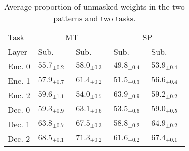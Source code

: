 \begin{table}[t]
    \centering
    \small
    \begin{tabular}{p{0.12\linewidth}p{0.15\linewidth}p{0.15\linewidth}p{0.15\linewidth}p{0.15\linewidth}}\toprule
    Task & \multicolumn{2}{c}{MT} & \multicolumn{2}{c}{SP}\\
    Layer & \dobjppiobjpp{} Sub. & \dobjppsubjpp{} Sub. & \dobjppiobjpp{} Sub. & \dobjppsubjpp{} Sub. \\\midrule
    Enc. 0 & $55.7_{\pm 0.2}$ & $58.0_{\pm 0.3}$ & $49.8_{\pm 0.4}$ & $53.9_{\pm 0.4}$\\
    Enc. 1 & $57.9_{\pm 0.7}$ & $61.4_{\pm 0.2}$ & $51.5_{\pm 0.3}$ & $56.6_{\pm 0.4}$\\ 
    Enc. 2 & $59.6_{\pm 1.1}$ & $54.0_{\pm 0.5}$ & $63.9_{\pm 0.9}$ & $59.2_{\pm 0.2}$\\
    Dec. 0 & $59.3_{\pm 0.9}$ & $63.1_{\pm 0.6}$ & $53.5_{\pm 0.6}$ & $59.0_{\pm 0.5}$\\
    Dec. 1 & $63.8_{\pm 0.7}$ & $67.5_{\pm 0.3}$ & $58.8_{\pm 0.2}$ & $64.9_{\pm 0.2}$\\
    Dec. 2 & $68.5_{\pm 0.1}$ & $71.3_{\pm 0.2}$ & $61.6_{\pm 0.2}$ & $67.4_{\pm 0.1}$\\
    \bottomrule
    \end{tabular}
    \caption{Average proportion of unmasked weights in the two patterns and two tasks.}
    \label{tab:results_subnetwork}
\end{table}